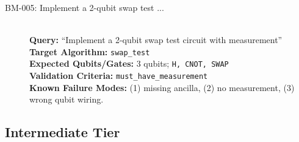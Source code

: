 \begin{description}
    \item[BM-005: Implement a 2-qubit swap test ...] \ \\
    \textbf{Query:} ``Implement a 2-qubit swap test circuit with measurement'' \\
    \textbf{Target Algorithm:} \texttt{swap\_test} \\
    \textbf{Expected Qubits/Gates:} 3 qubits; \texttt{H, CNOT, SWAP} \\
    \textbf{Validation Criteria:} \texttt{must\_have\_measurement} \\
    \textbf{Known Failure Modes:} (1) missing ancilla, (2) no measurement, (3) wrong qubit wiring.

\end{description}


\subsection*{Intermediate Tier}
